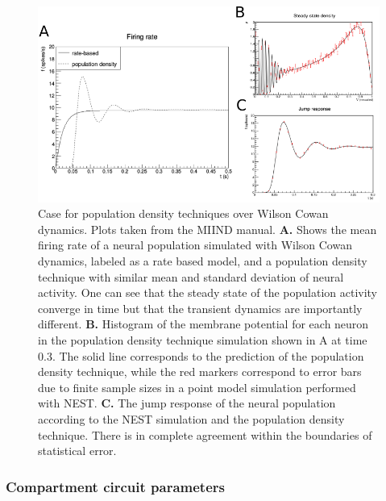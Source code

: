 \documentclass[10pt]{article}
\begin{document}
\begin{figure}[h!]
  \begin{center}
    \includegraphics[width=0.70\columnwidth]{figures/case_for_pdt1/case_for_pdt1}
    \caption{{\label{pdt_case} Case for population density techniques
        over Wilson Cowan dynamics. Plots taken from the MIIND manual.
        \textbf{A.} Shows the mean firing rate of a neural population simulated
        with Wilson Cowan dynamics, labeled as a rate based model, and
        a population density technique with similar mean and standard
        deviation of neural activity. One can see that the steady
        state of the population activity converge in time but that the
        transient dynamics are importantly different. \textbf{B.} Histogram of
        the membrane potential for each neuron in the population
        density technique simulation shown in A at time 0.3. The solid
        line corresponds to the prediction of the population density
        technique, while the red markers correspond to error bars due
        to finite sample sizes in a point model simulation performed
        with NEST. \textbf{C.} The jump response of the neural population
        according to the NEST simulation and the population density
        technique. There is in complete agreement within the boundaries
        of statistical error.%
      }}
  \end{center}
\end{figure}

\subsubsection{Compartment circuit
  parameters}\label{compartment-circuit-parameters}
\end{document}
